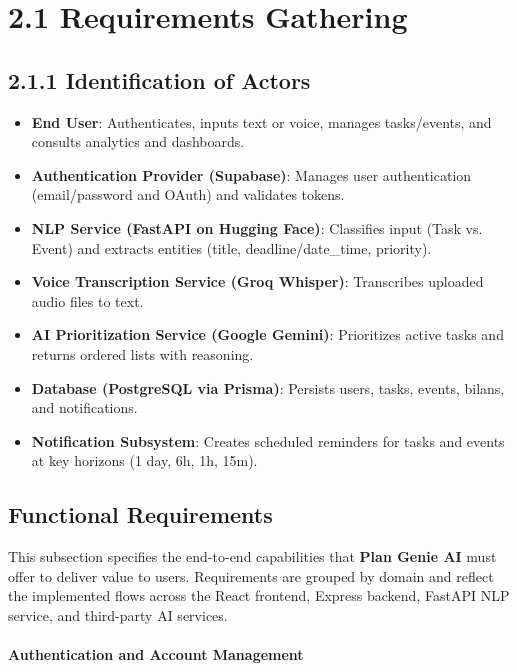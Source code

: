 \documentclass[12pt,a4paper]{article}
\begin{document}
\section*{2.1 Requirements Gathering}
\subsection*{2.1.1 Identification of Actors}
\begin{itemize}
  \item \textbf{End User}: Authenticates, inputs text or voice, manages tasks/events, and consults analytics and dashboards.
  \item \textbf{Authentication Provider (Supabase)}: Manages user authentication (email/password and OAuth) and validates tokens.
  \item \textbf{NLP Service (FastAPI on Hugging Face)}: Classifies input (Task vs. Event) and extracts entities (title, deadline/date\_time, priority).
  \item \textbf{Voice Transcription Service (Groq Whisper)}: Transcribes uploaded audio files to text.
  \item \textbf{AI Prioritization Service (Google Gemini)}: Prioritizes active tasks and returns ordered lists with reasoning.
  \item \textbf{Database (PostgreSQL via Prisma)}: Persists users, tasks, events, bilans, and notifications.
  \item \textbf{Notification Subsystem}: Creates scheduled reminders for tasks and events at key horizons (1 day, 6h, 1h, 15m).
\end{itemize}

\subsection{Functional Requirements}
This subsection specifies the end-to-end capabilities that \textbf{Plan Genie AI} must offer to deliver value to users. Requirements are grouped by domain and reflect the implemented flows across the React frontend, Express backend, FastAPI NLP service, and third-party AI services.

\paragraph{Authentication and Account Management}\mbox{}
\end{document}
